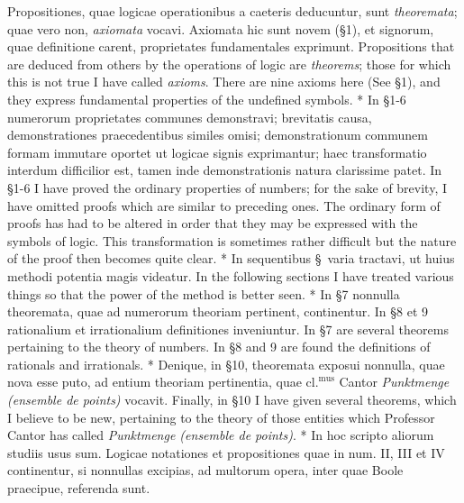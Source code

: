 \documentclass{book}
\newenvironment{translateTwoCol}
               { %
                 \columnratio{0.5, 0.5}
                 \begin{paracol}{2}
                 \newcommand{\LAT}{\switchcolumn[0]*}
                 \newcommand{\ENG}{\switchcolumn[1]}
               }
               { %
                 \let\ENG\undefined
                 \let\LAT\undefined
                 \end{paracol}
               }
\begin{document}
\begin{translateTwoCol}
Propositiones, quae logicae operationibus a caeteris deducuntur, sunt \emph{theoremata}; quae vero non, \emph{axiomata} vocavi. Axiomata hic sunt novem (\S 1), et signorum, quae definitione carent, proprietates fundamentales exprimunt.
\ENG
Propositions that are deduced from others by the operations of logic are \emph{theorems}; those for which this is not true I have called \emph{axioms}. There are nine axioms here (See \S 1), and they express fundamental properties of the undefined symbols.
\LAT
In \S 1-6 numerorum proprietates communes demonstravi; brevitatis causa, demonstrationes praecedentibus similes omisi; demonstrationum communem formam immutare oportet ut logicae signis exprimantur; haec transformatio interdum difficilior est, tamen inde demonstrationis natura clarissime patet.
\ENG
In \S 1-6 I have proved the ordinary properties of numbers; for the sake of brevity, I have omitted proofs which are similar to preceding ones. The ordinary form of proofs has had to be altered in order that they may be expressed with the symbols of logic. This transformation is sometimes rather difficult but the nature of the proof then becomes quite clear. 
\LAT
In sequentibus \S \ varia tractavi, ut huius methodi potentia magis videatur.
\ENG
In the following sections I have treated various things so that the power of the method is better seen.
\LAT
In \S 7 nonnulla theoremata, quae ad numerorum theoriam pertinent, continentur. In \S 8 et 9 rationalium et irrationalium definitiones inveniuntur.
\ENG
In \S 7 are several theorems pertaining to the theory of numbers. In \S 8 and 9 are found the definitions of rationals and irrationals.
\LAT
Denique, in \S 10, theoremata exposui nonnulla, quae nova esse puto, ad entium theoriam pertinentia, quae $\text{cl.}^{\text{mus}}$ Cantor \emph{Punktmenge (ensemble de points)} vocavit.
\ENG
Finally, in \S 10 I have given several theorems, which I believe to be new, pertaining to the theory of those entities which Professor Cantor has called \emph{Punktmenge (ensemble de points)}.
\LAT
In hoc scripto aliorum studiis usus sum. Logicae notationes et propositiones quae in num. II, III et IV continentur, si nonnullas excipias, ad multorum opera, inter quae Boole praecipue, referenda sunt.
\end{translateTwoCol}
\end{document}
